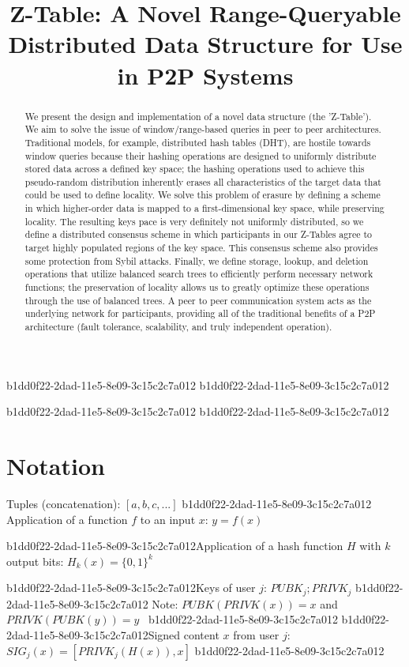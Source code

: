 \documentclass[12pt]{article}
\title{Z-Table: A Novel Range-Queryable Distributed Data Structure for Use in P2P Systems}
\begin{document}
\maketitle
b1dd0f22-2dad-11e5-8e09-3c15c2c7a012
b1dd0f22-2dad-11e5-8e09-3c15c2c7a012\begin{abstract}
We present the design and implementation of a novel data structure (the 'Z-Table'). We aim to solve the issue of window/range-based queries in peer to peer architectures. Traditional models, for example,  distributed hash tables (DHT), are hostile towards window queries because their hashing operations are designed to uniformly distribute stored data across a defined key space; the hashing operations used to achieve this pseudo-random distribution inherently erases all characteristics of the target data that could be used to define locality. We solve this problem of erasure by defining a scheme in which higher-order data is mapped to a first-dimensional key space, while preserving locality. The resulting keys pace is very definitely not uniformly distributed, so we define a distributed consensus scheme in which participants in our Z-Tables agree to target highly populated regions of the key space. This consensus scheme also provides some protection from Sybil attacks. Finally, we define storage, lookup, and deletion operations that utilize balanced search trees to efficiently perform necessary network functions; the preservation of locality allows us to greatly optimize these operations through the use of balanced trees. A peer to peer communication system acts as the underlying network for participants, providing all of the traditional benefits of a P2P architecture (fault tolerance, scalability, and truly independent operation).
\end{abstract}
b1dd0f22-2dad-11e5-8e09-3c15c2c7a012
b1dd0f22-2dad-11e5-8e09-3c15c2c7a012\section{Notation}

Tuples (concatenation): $[a,b,c,...]$
b1dd0f22-2dad-11e5-8e09-3c15c2c7a012
Application of a function $f$ to an input $x$: $y=f(x)$

b1dd0f22-2dad-11e5-8e09-3c15c2c7a012Application of a hash function $H$ with $k$ output bits: $H_{k}(x) = \{0,1\}^k$

b1dd0f22-2dad-11e5-8e09-3c15c2c7a012Keys of user $j$: $ PUBK_j; PRIVK_j $
b1dd0f22-2dad-11e5-8e09-3c15c2c7a012
Note: $PUBK(PRIVK(x)) = x$ and $PRIVK(PUBK(y)) = y$~
b1dd0f22-2dad-11e5-8e09-3c15c2c7a012
b1dd0f22-2dad-11e5-8e09-3c15c2c7a012Signed content $x$ from user $j$: $SIG_j(x) = \left[ PRIVK_j( H(x) ), x \right]$
b1dd0f22-2dad-11e5-8e09-3c15c2c7a012
\end{document}

